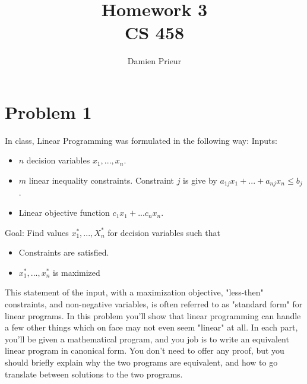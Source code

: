 \documentclass{article}
\author{Damien Prieur}
\title{Homework 3 \\ CS 458}
\date{}
\begin{document}
\maketitle

\section*{Problem 1}
In class, Linear Programming was formulated in the following way:
\newline
Inputs:
\begin{itemize}
\item $n$ decision variables $x_1, ... , x_n$.
\item $m$ linear inequality constraints. Constraint $j$ is give by $a_{1j}x_1 + ... + a_{nj}x_n \leq b_j$.
\item Linear objective function $c_1x_1 + ... c_nx_n$.
\end{itemize}
Goal: Find values $x_1^*, ... , X_n^*$ for decision variables such that
\begin{itemize}
\item Constraints are satisfied.
\item $x_1^*, ... ,x_n^*$ is maximized
\end{itemize}

\indent This statement of the input, with a maximization objective, "less-then" constraints, and non-negative variables, is often referred to as "standard form" for linear programs.
In this problem you'll show that linear programming can handle a few other things which on face may not even seem "linear" at all.
In each part, you'll be given a mathematical program, and you job is to write an equivalent linear program in canonical form.
You don't need to offer any proof, but you should briefly explain why the two programs are equivalent, and how to go translate between solutions to the two programs.
\end{document}
